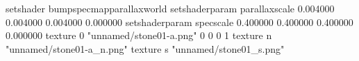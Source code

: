 setshader bumpspecmapparallaxworld
setshaderparam parallaxscale 0.004000 0.004000 0.004000 0.000000
setshaderparam specscale 0.400000 0.400000 0.400000 0.000000
texture 0 "unnamed/stone01-a.png" 0 0 0 1
texture n "unnamed/stone01-a_n.png"
texture s "unnamed/stone01_s.png"
